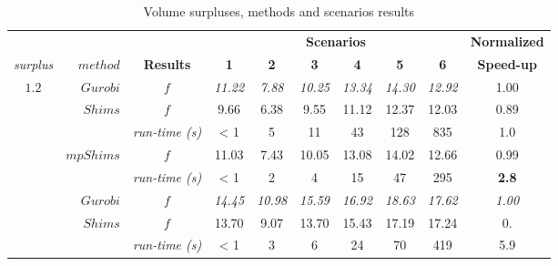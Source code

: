 \documentclass[preprint,authoryear]{elsarticle}
\begin{document}
\begin{table}[H]
\centering
\caption{Volume surpluses, methods and scenarios results}  \label{tab:results}
\footnotesize
\begin{tabular}{crcccccccc}
\toprule
&                          &                     &\multicolumn{6}{c}{\bf Scenarios}                                                                        &{\bf Normalized}\\
                                                 \cmidrule{4-9}		
{\it surplus}         & {$method$}               & {\bf Results}      &{\bf 1}      &{\bf 2}      &{\bf 3}      &{\bf 4}      &{\bf 5}       &{\bf 6}      &{\bf Speed-up} \\
\toprule



\multirow{6}{*}{$1.2$}&\multirow{1}{*}{ $Gurobi$}& $f$                &{\it 11.22}   &{\it 7.88}   &{\it 10.25} &{\it 13.34}  &{\it 14.30}   &{\it 12.92}       & 1.00 \\%

\cmidrule{2-10}		                       
&\multirow{2}{*}{ $Shims$}                       & $f$                & 9.66         &  6.38       &  9.55       &  11.12      &  12.37      &   12.03      & 0.89 \\%
&                                                & {\it run-time (s)} &  < 1         &  5          &    11       &   43        &  128        &  835         &  1.0 \\%

\cmidrule{2-10}		                       
&\multirow{2}{*}{ $mpShims$}                     & $f$                & 11.03        & 7.43        & 10.05       & 13.08       & 14.02       &  12.66       & 0.99\\%

&                                                & {\it run-time (s)} &  < 1         &  2          &    4        &  15         &  47         & 295          &  {\bf 2.8}\\%

\midrule

\multirow{6}{*}{$1.5$}&\multirow{1}{*}{ $Gurobi$}& $f$                &{\it 14.45}   &{\it 10.98}   &{\it 15.59}  &{\it 16.92}  &{\it 18.63}   &{\it 17.62}  & {\it 1.00} \\%

\cmidrule{2-10}		                       
&\multirow{2}{*}{ $Shims$}                       & $f$                & 13.70       &  9.07       &  13.70      &  15.43      &   17.19     &  17.24       & 0. \\%
&                                                & {\it run-time (s)} &  < 1        &  3          &    6        &   24        &   70        &  419         & 5.9\\%


\end{tabular}
\end{table}
\end{document}
